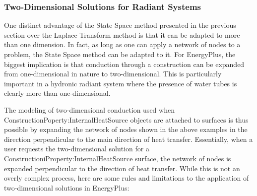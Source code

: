 \subsubsection{Two-Dimensional Solutions for Radiant Systems}\label{two-dimensional-solutions-for-radiant-systems}

One distinct advantage of the State Space method presented in the previous section over the Laplace Transform method is that it can be adapted to more than one dimension.  In fact, as long as one can apply a network of nodes to a problem, the State Space method can be adapted to it.  For EnergyPlus, the biggest implication is that conduction through a construction can be expanded from one-dimensional in nature to two-dimensional.  This is particularly important in a hydronic radiant system where the presence of water tubes is clearly more than one-dimensional.

The modeling of two-dimensional conduction used when
ConstructionPoperty:InternalHeatSource objects are attached to surfaces is thus
possible by expanding the network of nodes shown in the above examples in the
direction perpendicular to the main direction of heat transfer.  Essentially,
when a user requests the two-dimensional solution for a
ConstructioniProperty:InternalHeatSource surface, the network of nodes is
expanded perpendicular to the direction of heat transfer.  While this is not
an overly complex process, here are some rules and limitations to the
application of two-dimensional solutions in EnergyPlus:

